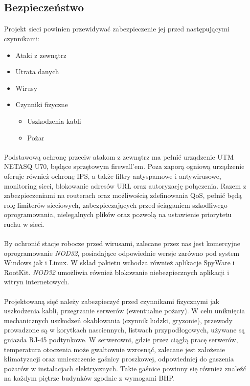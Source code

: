 \subsection{Bezpieczeństwo}
\paragraph{}
Projekt sieci powinien przewidywać zabezpieczenie jej przed następującymi czynnikami:
\begin{itemize}
	\item Ataki z zewnątrz
	\item Utrata danych
	\item Wirusy
	\item Czynniki fizyczne
	\begin{itemize}
		\item Uszkodzenia kabli
		\item Pożar
	\end{itemize}
\end{itemize}

\paragraph{}
Podstawową ochronę przeciw atakom z zewnątrz ma pełnić urządzenie UTM NETASQ U70, będące sprzętowym firewall'em. Poza zaporą ogniową  urządzenie oferuje również ochronę IPS, a także filtry antyspamowe i antywirusowe, monitoring sieci, blokowanie adresów URL oraz autoryzację połączenia. Razem z zabezpieczeniami na routerach oraz możliwością zdefinowania QoS, pełnić będą rolę limiterów sieciowych, zabezpieczających przed ściąganiem szkodliwego oprogramowania, nielegalnych plików oraz pozwolą na ustawienie priorytetu ruchu w sieci.

\paragraph{}
By ochronić stacje robocze przed wirusami, zalecane przez nas jest komercyjne oprogramowanie \textit{NOD32}, posiadające odpowiednie wersje zarówno pod system Windows jak i Linux. W skład pakietu wchodza również aplikacje SpyWare i RootKit. \textit{NOD32} umożliwia również blokowanie niebezpiecznych aplikacji i witryn internetowych.

\paragraph{}
Projektowaną sięć należy zabezpieczyć przed czynnikami fizycznymi jak uszkodzenia kabli, przegrzanie serwerów (ewentualne pożary). W celu uniknięcia mechanicznych uszkodzeń okablowania (czynnik ludzki, gryzonie), przewody prowadzone są w korytkach nasciennych, listwach przypodłogowych, używane są gniazda RJ-45 podtynkowe. W serwerowni, gdzie przez ciągłą pracę serwerów, temperatura otoczenia może gwałtownie wzrosnąć, zalecane jest założenie klimatyzacji oraz umieszczenie gaśnicy proszkowej, odpowiedniej do gaszenia pożarów w instalacjach elektrycznych. Takie gaśnice powinny się również znaleźć na każdym piętrze budynków zgodnie z wymogami BHP.

